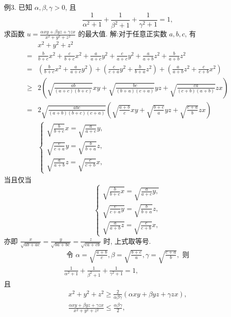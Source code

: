 例3. 已知 $\alpha, \beta, \gamma>0$, 且
$$
\frac{1}{\alpha^2+1}+\frac{1}{\beta^2+1}+\frac{1}{\gamma^2+1}=1,
$$
求函数 $u=\frac{\alpha x y+\beta y z+\gamma z x}{x^2+y^2+z^2}$ 的最大值.
解:对于任意正实数 $a, b, c$, 有
$$
\begin{aligned}
& x^2+y^2+z^2 \\
= & \frac{b}{b+c} x^2+\frac{c}{b+c} x^2+\frac{a}{a+c} y^2+\frac{c}{a+c} y^2+\frac{a}{a+b} z^2+\frac{b}{a+b} z^2 \\
= & \left(\frac{b}{b+c} x^2+\frac{a}{a+c} y^2\right)+\left(\frac{c}{c+a} y^2+\frac{b}{b+a} z^2\right)+\left(\frac{a}{a+b} z^2+\frac{c}{c+b} x^2\right) \\
\geqslant & 2\left(\sqrt{\frac{a b}{(a+c)(b+c)}} x y+\sqrt{\frac{b c}{(b+a)(c+a)}} y z+\sqrt{\frac{c a}{(c+b)(a+b)}} z x\right) \\
= & 2 \sqrt{\frac{a b c}{(a+b)(b+c)(c+a)}}\left(\sqrt{\frac{a+b}{c}} x y+\sqrt{\frac{b+c}{a}} y z+\sqrt{\frac{c+a}{b}} z x\right) \\
& \left\{\begin{array}{l}
\sqrt{\frac{b}{b+c}} x=\sqrt{\frac{a}{a+c}} y, \\
\sqrt{\frac{c}{c+a}} y=\sqrt{\frac{b}{b+a}} z, \\
\sqrt{\frac{a}{a+b}} z=\sqrt{\frac{c}{c+b}} x,
\end{array}\right.
\end{aligned}
$$
当且仅当
$$
\left\{\begin{array}{l}
\sqrt{\frac{b}{b+c} x}=\sqrt{\frac{a}{a+c} y,} \\
\sqrt{\frac{c}{c+a} y}=\sqrt{\frac{b}{b+a}} z, \\
\sqrt{\frac{a}{a+b} z}=\sqrt{\frac{c}{c+b}} x,
\end{array}\right.
$$
亦即 $\frac{x}{\sqrt{a b+a c}}=\frac{y}{\sqrt{b a+b c}}=\frac{z}{\sqrt{c a+c b}}$ 时, 上式取等号.
$$
\begin{array}{r}
\text { 令 } \alpha=\sqrt{\frac{a+b}{c}}, \beta=\sqrt{\frac{b+c}{a}}, \gamma=\sqrt{\frac{c+a}{b}}, \text { 则 } \\
\frac{1}{\alpha^2+1}+\frac{1}{\beta^2+1}+\frac{1}{\gamma^2+1}=1,
\end{array}
$$
且
$$
\begin{gathered}
x^2+y^2+z^2 \geqslant \frac{2}{\alpha \beta \gamma}(\alpha x y+\beta y z+\gamma z x), \\
\frac{\alpha x y+\beta y z+\gamma z x}{x^2+y^2+z^2} \leqslant \frac{\alpha \beta \gamma}{2},
\end{gathered}
$$
